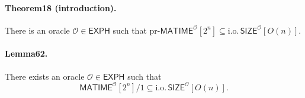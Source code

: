 \paragraph{Theorem18 (introduction).} There is an oracle $\mathcal O\in\mathsf{EXPH}$ such that $\mathrm{pr}\text{-}\mathsf{MATIME}^{\mathcal O}[2^n]\subseteq\mathrm{i.o.}\,\mathsf{SIZE}^{\mathcal O}[O(n)]$.
\paragraph{Lemma62.} There exists an oracle $\mathcal O\in\mathsf{EXPH}$ such that
\[\mathsf{MATIME}^{\mathcal O}[2^n]/1\subseteq\mathrm{i.o.}\,\mathsf{SIZE}^{\mathcal O}[O(n)].\]
